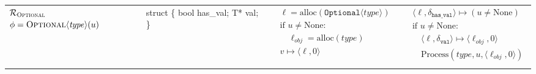 \begin{table}[htbp]
\begin{tabular}{m{}|m{}|>{\raggedright\arraybackslash}m{}|>{\raggedright\arraybackslash}m{}}
    $\mathcal{R}_{\textsc{Optional}}$ \newline $\phi=\textsc{Optional}\langle\mathit{type}\rangle(u)$ &
    {\ttfamily struct \{ \newline \hspace*{0.8em} bool has\_val; \newline \hspace*{0.8em} T* val; \newline \}} &
    $\begin{aligned}
      & \ell = \text{alloc}(\texttt{Optional}\langle\mathit{type}\rangle) \\
      & \text{if } u \neq \text{None}: \\
      & \quad \ell_{obj} = \text{alloc}(\mathit{type}) \\
      & v \mapsto \langle\ell, 0\rangle
    \end{aligned}$ &
    $\begin{aligned}
      & \langle \ell, \delta_{\texttt{has\_val}} \rangle \mapsto (u \neq \text{None}) \\
      & \text{if } u \neq \text{None}: \\
      & \quad \langle \ell, \delta_{\texttt{val}} \rangle \mapsto \langle\ell_{obj}, 0\rangle \\
      & \quad \text{Process}(\mathit{type}, u, \langle \ell_{obj}, 0 \rangle)
    \end{aligned}$
    \\
    \thickhline
  \end{tabular}
\end{table}
